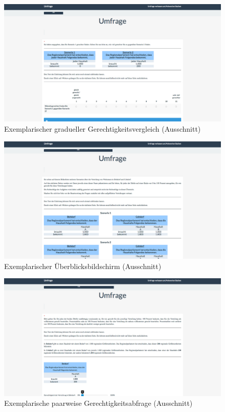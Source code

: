 \documentclass[a4paper]{thesis}
\begin{document}
\begin{figure}[H]
\centering
\includegraphics[width=1\textwidth]{figures/lime_8.png}
\caption[Exemplarischer gradueller Gerechtigkeitsvergleich (Ausschnitt)]{Exemplarischer gradueller Gerechtigkeitsvergleich (Ausschnitt)}
\end{figure}

\begin{figure}[H]
\centering
\includegraphics[width=1\textwidth]{figures/lime_9.png}
\caption[Exemplarischer Überblicksbildschirm (Ausschnitt)]{Exemplarischer Überblicksbildschirm (Ausschnitt)}
\end{figure}

\begin{figure}[H]
\centering
\includegraphics[width=1\textwidth]{figures/lime_10.png}
\caption[Exemplarische paarweise Gerechtigkeitsabfrage (Ausschnitt)]{Exemplarische paarweise Gerechtigkeitsabfrage (Ausschnitt)}
\end{figure}
\end{document}
